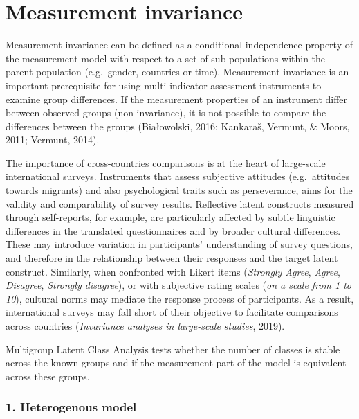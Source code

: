 \documentclass[12pt,a4paper,oneside]{reedthesis}
\begin{document}
\hypertarget{measurement-invariance}{%
\section{Measurement invariance}\label{measurement-invariance}}

Measurement invariance can be defined as a conditional independence property of the measurement model with respect to a set of sub-populations within the parent population (e.g.~gender, countries or time). Measurement invariance is an important prerequisite for using multi-indicator assessment instruments to examine group differences. If the measurement properties of an instrument differ between observed groups (non invariance), it is not possible to compare the differences between the groups (Białowolski, 2016; Kankaraš, Vermunt, \& Moors, 2011; Vermunt, 2014).

The importance of cross-countries comparisons is at the heart of large-scale international surveys. Instruments that assess subjective attitudes (e.g.~attitudes towards migrants) and also psychological traits such as perseverance, aims for the validity and comparability of survey results. Reflective latent constructs measured through self-reports, for example, are particularly affected by subtle linguistic differences in the translated questionnaires and by broader cultural differences. These may introduce variation in participants' understanding of survey questions, and therefore in the relationship between their responses and the target latent construct. Similarly, when confronted with Likert items (\emph{Strongly Agree}, \emph{Agree}, \emph{Disagree}, \emph{Strongly disagree}), or with subjective rating scales (\emph{on a scale from 1 to 10}), cultural norms may mediate the response process of participants. As a result, international surveys may fall short of their objective to facilitate comparisons across countries (\emph{Invariance analyses in large-scale studies}, 2019).

Multigroup Latent Class Analysis tests whether the number of classes is stable across the known groups and if the measurement part of the model is equivalent across these groups.

\hypertarget{heterogenous-model}{%
\subsubsection{1. Heterogenous model}\label{heterogenous-model}}
\end{document}
